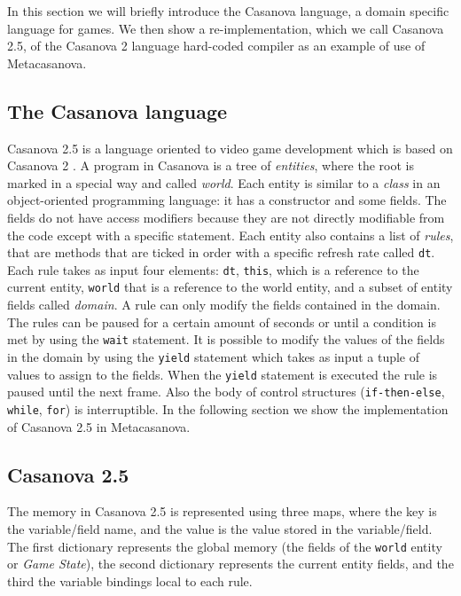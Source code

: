 In this section we will briefly introduce the Casanova language, a domain specific language for games. We then show a re-implementation, which we call Casanova 2.5, of the Casanova 2 language hard-coded compiler as an example of use of Metacasanova.

\subsection{The Casanova language}
Casanova 2.5 is a language oriented to video game development which is based on Casanova 2 \cite{CASANOVA2_PAPER}. A program in Casanova is a tree of \textit{entities}, where the root is marked in a special way and called \textit{world}. Each entity is similar to a \textit{class} in an object-oriented programming language: it has a constructor and some fields. The fields do not have access modifiers because they are not directly modifiable from the code except with a specific statement. Each entity also contains a list of \textit{rules}, that are methods that are ticked in order with a specific refresh rate called \texttt{dt}. Each rule takes as input four elements: \texttt{dt}, \texttt{this}, which is a reference to the current entity, \texttt{world} that is a reference to the world entity, and a subset of entity fields called \textit{domain}. A rule can only modify the fields contained in the domain. The rules can be paused for a certain amount of seconds or until a condition is met by using the \texttt{wait} statement. It is possible to modify the values of the fields in the domain by using the \texttt{yield} statement which takes as input a tuple of values to assign to the fields. When the \texttt{yield} statement is executed the rule is paused until the next frame. Also the body of control structures (\texttt{if-then-else}, \texttt{while}, \texttt{for}) is interruptible. In the following section we show the implementation of Casanova 2.5 in Metacasanova.

\subsection{Casanova 2.5}
The memory in Casanova 2.5 is represented using three maps, where the key is the variable/field name, and the value is the value stored in the variable/field. The first dictionary represents the global memory (the fields of the \texttt{world} entity or \textit{Game State}), the second dictionary represents the current entity fields, and the third the variable bindings local to each rule.

